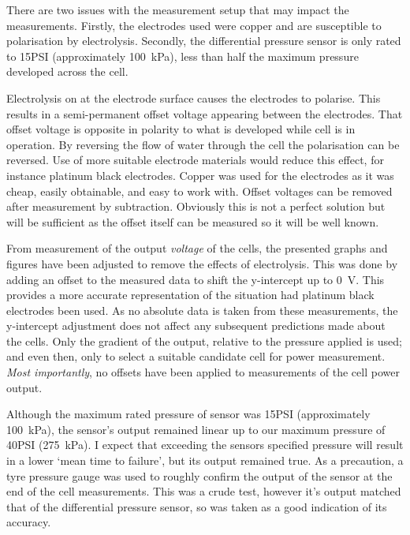     There are two issues with the measurement setup that may impact the measurements.
    Firstly, the electrodes used were copper and are susceptible to polarisation by electrolysis.
    Secondly, the differential pressure sensor is only rated to 15\thinspace PSI (approximately \SI{100}{\kilo\pascal}), less than half the maximum pressure developed across the cell.

    Electrolysis on at the electrode surface causes the electrodes to polarise.
    This results in a semi-permanent offset voltage appearing between the electrodes.
    That offset voltage is opposite in polarity to what is developed while cell is in operation.
    By reversing the flow of water through the cell the polarisation can be reversed.
    Use of more suitable electrode materials would reduce this effect, for instance platinum black electrodes.
    Copper was used for the electrodes as it was cheap, easily obtainable, and easy to work with.
    Offset voltages can be removed after measurement by subtraction.
    Obviously this is not a perfect solution but will be sufficient as the offset itself can be measured so it will be well known.

    From measurement of the output \emph{voltage} of the cells, the presented graphs and figures have been adjusted to remove the effects of electrolysis.
    This was done by adding an offset to the measured data to shift the y-intercept up to \SI{0}{\volt}.
    This provides a more accurate representation of the situation had platinum black electrodes been used.
    As no absolute data is taken from these measurements, the y-intercept adjustment does not affect any subsequent predictions made about the cells.
    Only the gradient of the output, relative to the pressure applied is used; and even then, only to select a suitable candidate cell for power measurement.
    \emph{Most importantly}, no offsets have been applied to measurements of the cell power output.

    Although the maximum rated pressure of sensor was 15\thinspace PSI (approximately \SI{100}{\kilo\pascal}), the sensor's output remained linear up to our maximum pressure of 40\thinspace PSI (\SI{275}{\kilo\pascal}).
    I expect that exceeding the sensors specified pressure will result in a lower `mean time to failure', but its output remained true.
    As a precaution, a tyre pressure gauge was used to roughly confirm the output of the sensor at the end of the cell measurements.
    This was a crude test, however it's output matched that of the differential pressure sensor, so was taken as a good indication of its accuracy.


